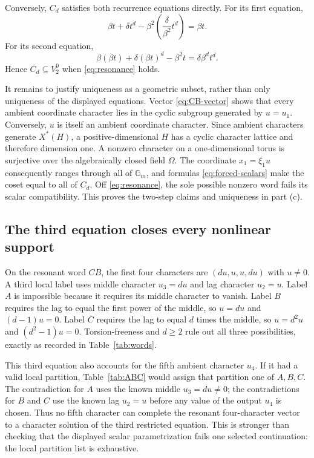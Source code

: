 \documentclass[11pt]{article}
\theoremstyle{definition}
\theoremstyle{remark}
\newcommand{\Gm}{\mathbb{G}_{m}}
\newcommand{\Om}{\Omega}
\begin{document}
Conversely, $C_d$ satisfies both recurrence equations directly.  For its first equation,
\[
\beta t+\delta t^d-\beta^2
  \left(\frac{\delta}{\beta^2}t^d\right)=\beta t.
\]
For its second equation,
\[
\beta(\beta t)+\delta(\beta t)^d-\beta^2t
=\delta\beta^dt^d.
\]
Hence $C_d\subseteq V_2^0$ when \eqref{eq:resonance} holds.

It remains to justify uniqueness as a geometric subset, rather than only uniqueness of the displayed equations.  Vector \eqref{eq:CB-vector} shows that every ambient coordinate character lies in the cyclic subgroup generated by $u=u_1$.  Conversely, $u$ is itself an ambient coordinate character.  Since ambient characters generate $X^*(H)$, a positive-dimensional $H$ has a cyclic character lattice and therefore dimension one.  A nonzero character on a one-dimensional torus is surjective over the algebraically closed field $\Om$.  The coordinate $x_1=\xi_1u$ consequently ranges through all of $\Gm$, and formulas \eqref{eq:forced-scalars} make the coset equal to all of $C_d$.  Off \eqref{eq:resonance}, the sole possible nonzero word fails its scalar compatibility.  This proves the two-step claims and uniqueness in part (c).

\subsection{The third equation closes every nonlinear support}

On the resonant word $CB$, the first four characters are
$(du,u,u,du)$ with $u\neq0$.  A third local label uses middle character $u_3=du$ and lag character $u_2=u$.  Label $A$ is impossible because it requires its middle character to vanish.  Label $B$ requires the lag to equal the first power of the middle, so $u=du$ and $(d-1)u=0$.  Label $C$ requires the lag to equal $d$ times the middle, so $u=d^2u$ and $(d^2-1)u=0$.  Torsion-freeness and $d\geq2$ rule out all three possibilities, exactly as recorded in Table~\ref{tab:words}.

This third equation also accounts for the fifth ambient character $u_4$.
If it had a valid local partition, Table~\ref{tab:ABC} would assign that
partition one of $A,B,C$.  The contradiction for $A$ uses the known middle
$u_3=du\neq0$; the contradictions for $B$ and $C$ use the known lag
$u_2=u$ before any value of the output $u_4$ is chosen.  Thus no fifth
character can complete the resonant four-character vector to a character
solution of the third restricted equation.  This is stronger than checking
that the displayed scalar parametrization fails one selected continuation:
the local partition list is exhaustive.
\end{document}
